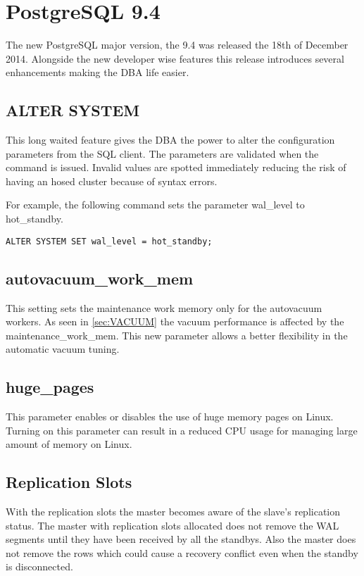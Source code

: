 \chapter{PostgreSQL 9.4}

The new PostgreSQL major version, the 9.4 was released the 18th of December 2014. Alongside the
new developer wise features this release introduces several enhancements making the DBA life easier.

\section{ALTER SYSTEM}
This long waited feature gives the DBA the power to alter the configuration parameters
from the SQL client. The parameters are validated when the command is issued. Invalid values
are spotted immediately reducing the risk of having an hosed cluster because of syntax errors.

For example, the following command sets the parameter wal\_level to hot\_standby.
\begin{lstlisting}[style=pgsql]
 ALTER SYSTEM SET wal_level = hot_standby;

\end{lstlisting}

\section{autovacuum\_work\_mem}
This setting sets the maintenance work memory only for the autovacuum workers. As seen in
\ref{sec:VACUUM} the vacuum performance is affected by the maintenance\_work\_mem. This new
parameter allows a better flexibility in the automatic vacuum tuning.


\section{huge\_pages}
This parameter enables or disables the use of huge memory pages on Linux. Turning on this parameter can
result in a reduced CPU usage for managing large amount of memory on Linux.

\section{Replication Slots}
With the replication slots the master becomes aware of the slave's replication status. The master
with replication slots allocated does not remove the WAL segments until they have been received by all
the standbys. Also the master does not remove the rows which could cause a recovery conflict even when
the standby is disconnected.

